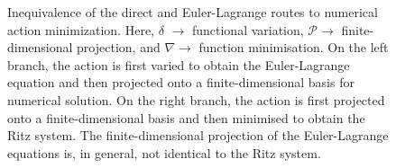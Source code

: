 \documentclass[]{cam-thesis}
\begin{document}
\begin{figure}
\begin{center}
\end{center}  
\begin{center}
\vspace{-0.6cm}
\end{center}  


\caption{Inequivalence of the direct and Euler-Lagrange routes to numerical
action minimization. Here, $\delta$ $\rightarrow$ functional variation,
$\mathcal{P}\rightarrow$ finite-dimensional projection, and $\nabla\rightarrow$
function minimisation. On the left branch, the action is first varied
to obtain the Euler-Lagrange equation and then projected onto a finite-dimensional
basis for numerical solution. On the right branch, the action is first
projected onto a finite-dimensional basis and then minimised to obtain
the Ritz system. The finite-dimensional projection of the Euler-Lagrange
equations is, in general, not identical to the Ritz system.}

\centering{}\label{fig:discrete-el-versus-ritz}
\end{figure}
\end{document}
